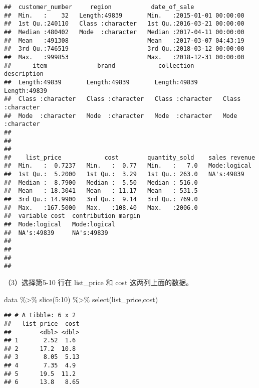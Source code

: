 \documentclass[
]{article}
\newenvironment{Shaded}{\begin{snugshade}}{\end{snugshade}}
\newcommand{\DecValTok}[1]{\textcolor[rgb]{0.00,0.00,0.81}{#1}}
\newcommand{\FunctionTok}[1]{\textcolor[rgb]{0.00,0.00,0.00}{#1}}
\newcommand{\NormalTok}[1]{#1}
\newcommand{\SpecialCharTok}[1]{\textcolor[rgb]{0.00,0.00,0.00}{#1}}
\begin{document}
\begin{verbatim}
##  customer_number     region           date_of_sale                
##  Min.   :    32   Length:49839       Min.   :2015-01-01 00:00:00  
##  1st Qu.:240110   Class :character   1st Qu.:2016-03-21 00:00:00  
##  Median :480402   Mode  :character   Median :2017-04-11 00:00:00  
##  Mean   :491308                      Mean   :2017-03-07 04:43:19  
##  3rd Qu.:746519                      3rd Qu.:2018-03-12 00:00:00  
##  Max.   :999853                      Max.   :2018-12-31 00:00:00  
##      item              brand            collection        description       
##  Length:49839       Length:49839       Length:49839       Length:49839      
##  Class :character   Class :character   Class :character   Class :character  
##  Mode  :character   Mode  :character   Mode  :character   Mode  :character  
##                                                                             
##                                                                             
##                                                                             
##    list_price            cost        quantity_sold    sales revenue 
##  Min.   :  0.7237   Min.   :  0.77   Min.   :   7.0   Mode:logical  
##  1st Qu.:  5.2000   1st Qu.:  3.29   1st Qu.: 263.0   NA's:49839    
##  Median :  8.7900   Median :  5.50   Median : 516.0                 
##  Mean   : 18.3041   Mean   : 11.17   Mean   : 531.5                 
##  3rd Qu.: 14.9900   3rd Qu.:  9.14   3rd Qu.: 769.0                 
##  Max.   :167.5000   Max.   :108.40   Max.   :2006.0                 
##  variable cost  contribution margin
##  Mode:logical   Mode:logical       
##  NA's:49839     NA's:49839         
##                                    
##                                    
##                                    
## 
\end{verbatim}

（3）选择第5-10 ⾏在 list\_price 和 cost 这两列上⾯的数据。

\begin{Shaded}
\begin{Highlighting}[]
\NormalTok{data }\SpecialCharTok{\%\textgreater{}\%}
  \FunctionTok{slice}\NormalTok{(}\DecValTok{5}\SpecialCharTok{:}\DecValTok{10}\NormalTok{) }\SpecialCharTok{\%\textgreater{}\%}
  \FunctionTok{select}\NormalTok{(list\_price,cost)}
\end{Highlighting}
\end{Shaded}

\begin{verbatim}
## # A tibble: 6 x 2
##   list_price  cost
##        <dbl> <dbl>
## 1       2.52  1.6 
## 2      17.2  10.8 
## 3       8.05  5.13
## 4       7.35  4.9 
## 5      19.5  11.2 
## 6      13.8   8.65
\end{verbatim}
\end{document}
